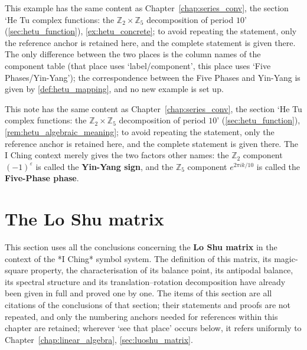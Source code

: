\begin{example}\label{ex:hetu_concrete_yijing}
This example has the same content as Chapter~\ref{chap:series_conv}, the section `He Tu complex functions: the $\mathbb{Z}_2\times\mathbb{Z}_5$ decomposition of period $10$' (\cref{sec:hetu_function}), \cref{ex:hetu_concrete}; to avoid repeating the statement, only the reference anchor is retained here, and the complete statement is given there. The only difference between the two places is the column names of the component table (that place uses `label/component', this place uses `Five Phases/Yin-Yang'); the correspondence between the Five Phases and Yin-Yang is given by \cref{def:hetu_mapping}, and no new example is set up.
\end{example}

\begin{remark}
This note has the same content as Chapter~\ref{chap:series_conv}, the section `He Tu complex functions: the $\mathbb{Z}_2\times\mathbb{Z}_5$ decomposition of period $10$' (\cref{sec:hetu_function}), \cref{rem:hetu_algebraic_meaning}; to avoid repeating the statement, only the reference anchor is retained here, and the complete statement is given there. The I Ching context merely gives the two factors other names: the $\mathbb{Z}_2$ component $(-1)^{\varepsilon}$ is called the \textbf{Yin-Yang sign}, and the $\mathbb{Z}_5$ component $e^{2\pi i k/10}$ is called the \textbf{Five-Phase phase}.
\end{remark}

\section{The Lo Shu matrix}

This section uses all the conclusions concerning the \textbf{Lo Shu matrix} in the context of the *I Ching* symbol system. The definition of this matrix, its magic-square property, the characterisation of its balance point, its antipodal balance, its spectral structure and its translation--rotation decomposition have already been given in full and proved one by one. The items of this section are all citations of the conclusions of that section; their statements and proofs are not repeated, and only the numbering anchors needed for references within this chapter are retained; wherever `see that place' occurs below, it refers uniformly to Chapter~\ref{chap:linear_algebra}, \cref{sec:luoshu_matrix}.


